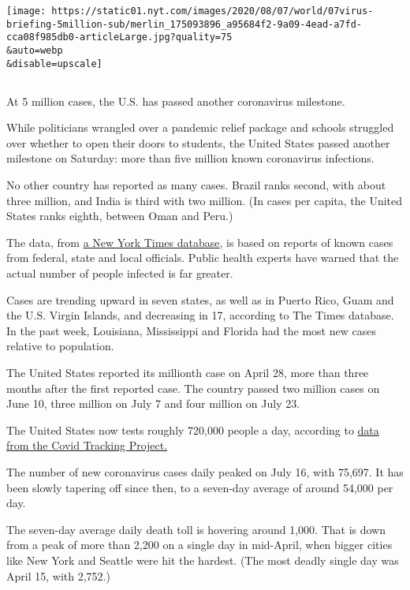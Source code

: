 \texttt{[image: https://static01.nyt.com/images/2020/08/07/world/07virus-briefing-5million-sub/merlin\_175093896\_a95684f2-9a09-4ead-a7fd-cca08f985db0-articleLarge.jpg?quality=75\\\&auto=webp\\\&disable=upscale]}

\hypertarget{section}{%
\subsection{}\label{section}}

At 5 million cases, the U.S. has passed another coronavirus milestone.

While politicians wrangled over a pandemic relief package and schools
struggled over whether to open their doors to students, the United
States passed another milestone on Saturday: more than five million
known coronavirus infections.

No other country has reported as many cases. Brazil ranks second, with
about three million, and India is third with two million. (In cases per
capita, the United States ranks eighth, between Oman and Peru.)

The data, from
\href{https://www.nytimes.com/interactive/2020/us/coronavirus-us-cases.html}{a
New York Times database}, is based on reports of known cases from
federal, state and local officials. Public health experts have warned
that the actual number of people infected is far greater.

Cases are trending upward in seven states, as well as in Puerto Rico,
Guam and the U.S. Virgin Islands, and decreasing in 17, according to The
Times database. In the past week, Louisiana, Mississippi and Florida had
the most new cases relative to population.

The United States reported its millionth case on April 28, more than
three months after the first reported case. The country passed two
million cases on June 10, three million on July 7 and four million on
July 23.

The United States now tests roughly 720,000 people a day, according to
\href{https://covidtracking.com/data/us-daily}{data from the Covid
Tracking Project.}

The number of new coronavirus cases daily peaked on July 16, with
75,697. It has been slowly tapering off since then, to a seven-day
average of around 54,000 per day.

The seven-day average daily death toll is hovering around 1,000. That is
down from a peak of more than 2,200 on a single day in mid-April, when
bigger cities like New York and Seattle were hit the hardest. (The most
deadly single day was April 15, with 2,752.)

